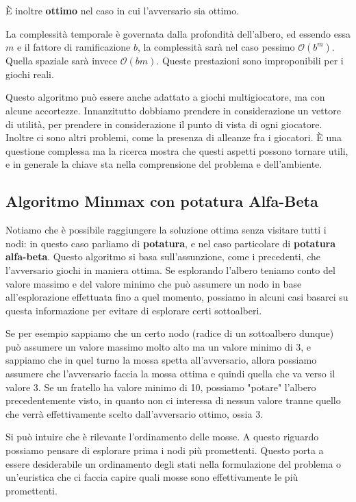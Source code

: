         È inoltre \textbf{ottimo} nel caso in cui l'avversario sia ottimo.
        
        La complessità temporale è governata dalla profondità dell'albero, ed essendo essa $m$ e il fattore di ramificazione $b$, la complessità sarà nel caso pessimo $\mathcal{O}(b^m)$. Quella spaziale sarà invece $\mathcal{O}(bm)$. Queste prestazioni sono improponibili per i giochi reali.
        
        Questo algoritmo può essere anche adattato a giochi multigiocatore, ma con alcune accortezze. Innanzitutto dobbiamo prendere in considerazione un vettore di utilità, per prendere in considerazione il punto di vista di ogni giocatore. Inoltre ci sono altri problemi, come la presenza di alleanze fra i giocatori. È una questione complessa ma la ricerca mostra che questi aspetti possono tornare utili, e in generale la chiave sta nella comprensione del problema e dell'ambiente.
        
    \subsection{Algoritmo Minmax con potatura Alfa-Beta}
        Notiamo che è possibile raggiungere la soluzione ottima senza visitare tutti i nodi: in questo caso parliamo di \textbf{potatura}, e nel caso particolare di \textbf{potatura alfa-beta}. Questo algoritmo si basa sull'assunzione, come i precedenti, che l'avversario giochi in maniera ottima. Se esplorando l'albero teniamo conto del valore massimo e del valore minimo che può assumere un nodo in base all'esplorazione effettuata fino a quel momento, possiamo in alcuni casi basarci su questa informazione per evitare di esplorare certi sottoalberi.
        
        Se per esempio sappiamo che un certo nodo (radice di un sottoalbero dunque) può assumere un valore massimo molto alto ma un valore minimo di 3, e sappiamo che in quel turno la mossa spetta all'avversario, allora possiamo assumere che l'avversario faccia la mossa ottima e quindi quella che va verso il valore 3. Se un fratello ha valore minimo di 10, possiamo "potare" l'albero precedentemente visto, in quanto non ci interessa di nessun valore tranne quello che verrà effettivamente scelto dall'avversario ottimo, ossia 3.
        
        Si può intuire che è rilevante l'ordinamento delle mosse. A questo riguardo possiamo pensare di esplorare prima i nodi più promettenti. Questo porta a essere desiderabile un ordinamento degli stati nella formulazione del problema o un'euristica che ci faccia capire quali mosse sono effettivamente le più promettenti.
        
